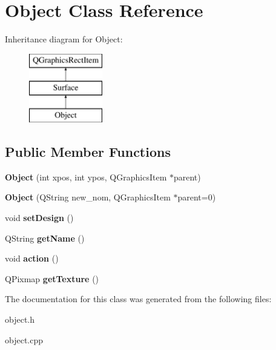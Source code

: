 \hypertarget{class_object}{}\section{Object Class Reference}
\label{class_object}
Inheritance diagram for Object\+:\begin{figure}[H]
\begin{center}
\leavevmode
\includegraphics[height=3.000000cm]{class_object}
\end{center}
\end{figure}
\subsection*{Public Member Functions}
\begin{DoxyCompactItemize}
\item 
\hypertarget{class_object_a61b5e9862ead7000e3125be5d81263a2}{}{\bfseries Object} (int xpos, int ypos, Q\+Graphics\+Item $\ast$parent)\label{class_object_a61b5e9862ead7000e3125be5d81263a2}

\item 
\hypertarget{class_object_a92bae89e044afc5957483772f557c5d7}{}{\bfseries Object} (Q\+String new\+\_\+nom, Q\+Graphics\+Item $\ast$parent=0)\label{class_object_a92bae89e044afc5957483772f557c5d7}

\item 
\hypertarget{class_object_a64d92ae18b1e70a8435690fe6fccf1fd}{}void {\bfseries set\+Design} ()\label{class_object_a64d92ae18b1e70a8435690fe6fccf1fd}

\item 
\hypertarget{class_object_a13fe059222e66ea54aa3f6f8615a3d72}{}Q\+String {\bfseries get\+Name} ()\label{class_object_a13fe059222e66ea54aa3f6f8615a3d72}

\item 
\hypertarget{class_object_a7007c7349c695b9ca7ad463d54081c25}{}void {\bfseries action} ()\label{class_object_a7007c7349c695b9ca7ad463d54081c25}

\item 
\hypertarget{class_object_a2678fa7a8ab432607b228e8d311f2873}{}Q\+Pixmap {\bfseries get\+Texture} ()\label{class_object_a2678fa7a8ab432607b228e8d311f2873}

\end{DoxyCompactItemize}


The documentation for this class was generated from the following files\+:\begin{DoxyCompactItemize}
\item 
object.\+h\item 
object.\+cpp\end{DoxyCompactItemize}
